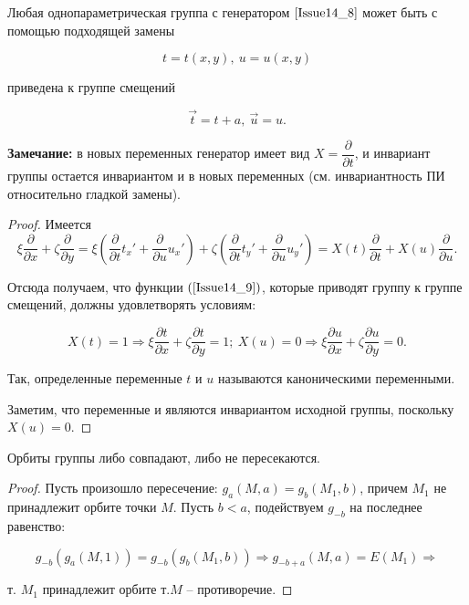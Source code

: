 \begin{theorem}
	Любая однопараметрическая группа с генератором $\ref{Issue14_8}$ может быть с помощью подходящей замены 
	
	\begin{equation}
		t = t(x,y),\ u = u(x,y)
		\label{Issue14_9}
	\end{equation}
	
	приведена к группе смещений 
	
	\begin{equation}
		\vec{t} = t + a,\ \vec{u} = u.
		\label{Issue14_10}
	\end{equation}
	
	\textbf{Замечание:} в новых переменных генератор имеет вид $X = \dfrac{\partial}{\partial t}$, и инвариант группы остается инвариантом и в новых переменных (см. инвариантность ПИ относительно гладкой замены).
	
	\begin{proof}
		
		Имеется \[\xi \dfrac{\partial}{\partial x} + \zeta \dfrac{\partial}{\partial y} = \xi\left(\dfrac{\partial}{\partial t}t_x' + \dfrac{\partial}{\partial u}u_x'\right) + \zeta\left(\dfrac{\partial}{\partial t}t_y' + \dfrac{\partial}{\partial u}u_y'\right) = X(t)\dfrac{\partial}{\partial t} + X(u)\dfrac{\partial}{\partial u}.\]
		
		Отсюда получаем, что функции $(\ref{Issue14_9})$, которые приводят группу к группе смещений, должны удовлетворять условиям:
		
		\begin{equation}
			X(t) = 1 \Rightarrow \xi \dfrac{\partial t}{\partial x} + \zeta \dfrac{\partial t}{\partial y} = 1;\ X(u) = 0 \Rightarrow \xi \dfrac{\partial u}{\partial x} + \zeta \dfrac{\partial u}{\partial y} = 0.
			\label{Issue14_11}
		\end{equation}
		
		Так, определенные переменные $t$ и $u$ называются $\textbf{каноническими переменными}$.
		
		Заметим, что переменные и являются инвариантом исходной группы, поскольку \\
		$X(u) = 0.$
		
	\end{proof}
\end{theorem} 


\begin{theorem}
	
	Орбиты группы либо совпадают, либо не пересекаются.
	
	\begin{proof}
		
		Пусть произошло пересечение: $g_a(M,a) = g_b(M_1,b)$, причем $M_1$ не принадлежит орбите точки $M$. Пусть $b < a$, подействуем $g_{-b}$ на последнее равенство:
		
		\[ g_{-b}(g_a(M,1)) = g_{-b}(g_b(M_1, b)) \Rightarrow g_{-b+a}(M,a) = E(M_1) \Rightarrow\]
		
		т. $M_1$ принадлежит орбите т.$M$ -- противоречие.
		
	\end{proof}
	
\end{theorem}


